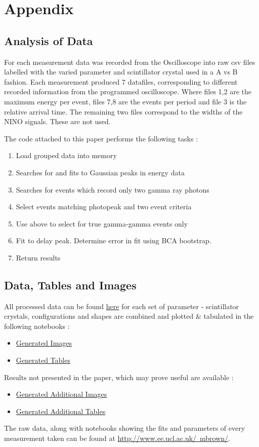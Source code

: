 \section*{Appendix}
\subsection{Analysis of Data}
For each measurement data was recorded from the Oscilloscope into raw csv files labelled with the varied parameter and scintillator crystal used in a A vs B fashion. Each measurement produced 7 datafiles, corresponding to different recorded information from the programmed oscilloscope. Where files 1,2 are the maximum energy per event, files 7,8 are the events per period and file 3 is the relative arrival time. The remaining two files correspond to the widths of the NINO signals. These are not used.

The code attached to this paper performs the following tasks : 

\begin{enumerate}
\item Load grouped data into memory
\item Searches for and fits to Gaussian peaks in energy data
\item Searches for events which record only two gamma ray photons
\item Select events matching photopeak and two event criteria
\item Use above to select for true gamma-gamma events only
\item Fit to delay peak. Determine error in fit using BCA bootstrap.
\item Return results
\end{enumerate}

\subsection{Data, Tables and Images}
All processed data can be found \href{https://github.com/marksbrown/doipaper/tree/master/processeddata}{here} for each set of parameter - scintillator crystals, configurations and shapes are combined and plotted \& tabulated in the following notebooks :
\begin{itemize}
\item \href{http://nbviewer.ipython.org/github/marksbrown/doipaper/blob/master/notebooks/Generate\%20Images.ipynb}{Generated Images}
\item \href{http://nbviewer.ipython.org/github/marksbrown/doipaper/blob/master/notebooks/Generate\%20Tables.ipynb}{Generated Tables}
\end{itemize}
Results not presented in the paper, which may prove useful are available :
\begin{itemize}
\item \href{http://nbviewer.ipython.org/github/marksbrown/doipaper/blob/master/notebooks/Generate\%20Additional\%20Images.ipynb}{Generated Additional Images}
\item \href{http://nbviewer.ipython.org/github/marksbrown/doipaper/blob/master/notebooks/Generate\%20Additional\%20Tables.ipynb}{Generated Additional Tables}
\end{itemize}

The raw data, along with notebooks showing the fits and parameters of every measurement taken can be found at \href{http://www.ee.ucl.ac.uk/~mbrown/}{http://www.ee.ucl.ac.uk/~mbrown/}.
